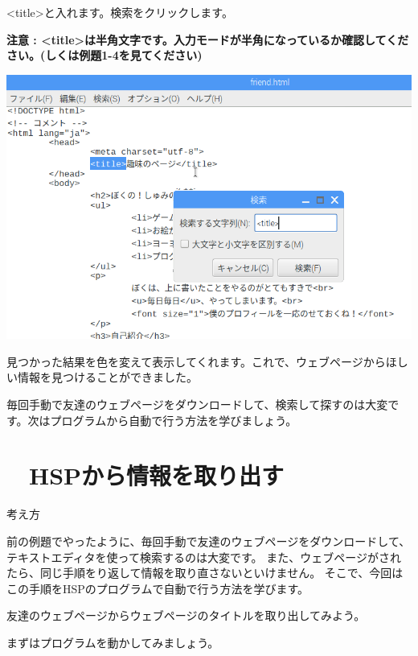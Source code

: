 {\textless}title{\textgreater}と入れます。検索をクリックします。

{\bfseries
注意 :
{\textless}title{\textgreater}は半角文字です。入力モードが半角になっているか確認してください。(しくは例題1-4を見てください)}



\begin{center}
\includegraphics[width=\textwidth]{./text08-img/textbook-img012.png}

\end{center}
見つかった結果を色を変えて表示してくれます。これで、ウェブページからほしい情報を見つけることができました。


\bigskip

毎回手動で友達のウェブページをダウンロードして、検索して探すのは大変です。次はプログラムから自動で行う方法を学びましょう。
\clearpage\section{\theExercise　HSPから情報を取り出す}
\addtocounter{Exercise}{-1}\label{E:SCRAPING}
考え方

前の例題でやったように、毎回手動で友達のウェブページをダウンロードして、テキストエディタを使って検索するのは大変です。
また、ウェブページがされたら、同じ手順をり返して情報を取り直さないといけません。
そこで、今回はこの手順をHSPのプログラムで自動で行う方法を学びます。

友達のウェブページからウェブページのタイトルを取り出してみよう。

まずはプログラムを動かしてみましょう。


